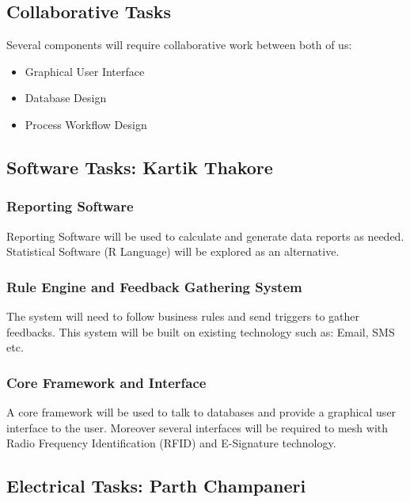 \documentclass{journal}
\begin{document}
\subsection{ Collaborative Tasks }

Several components will require collaborative work between both of us:

\begin{itemize}
\item Graphical User Interface
\item Database  Design
\item Process Workflow Design
\end{itemize}

\subsection{ Software Tasks: Kartik Thakore }

\subsubsection{Reporting Software}

Reporting Software will be used to calculate and generate data reports as needed. Statistical Software (R Language) will be explored as an alternative.

\subsubsection{Rule Engine and Feedback Gathering System}

The system will need to follow business rules and send triggers to gather feedbacks. This system will be built on existing technology such as: Email, SMS etc. 

\subsubsection{Core Framework and Interface}

A core framework will be used to talk to databases and provide a graphical user interface to the user. Moreover several interfaces will be required to mesh with Radio Frequency Identification (RFID) and E-Signature technology. 

\subsection{ Electrical Tasks: Parth Champaneri }
\end{document}
